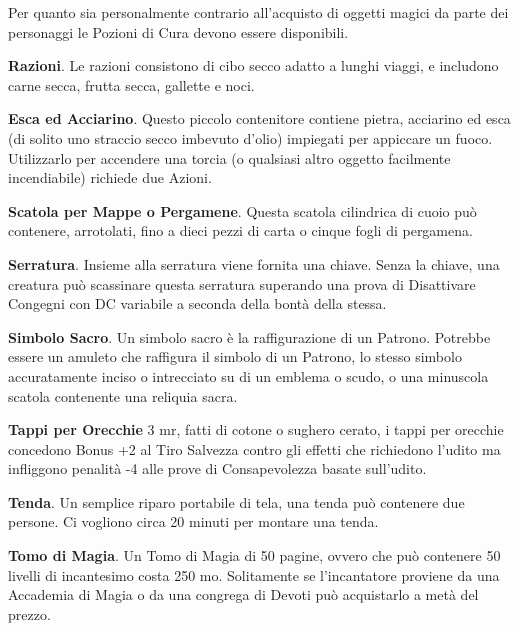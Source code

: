 \begin{multicols}{2}
\begin{narratore}
Per quanto sia personalmente contrario all'acquisto di oggetti magici da parte dei personaggi le Pozioni di Cura devono essere disponibili.
\end{narratore}

\textbf{Razioni}\hypertarget{Razioni}{}\label{Razioni}. Le razioni consistono di cibo secco adatto a lunghi viaggi, e includono carne secca, frutta secca, gallette e noci.

\textbf{Esca ed Acciarino}\label{Esca ed Acciarino}\hypertarget{Esca ed Acciarino}{}. Questo piccolo contenitore contiene pietra, acciarino ed esca (di solito uno straccio secco imbevuto d'olio) impiegati per appiccare un fuoco. Utilizzarlo per accendere una torcia (o qualsiasi altro oggetto facilmente incendiabile) richiede due Azioni.

\textbf{Scatola per Mappe o Pergamene}. Questa scatola cilindrica di cuoio può contenere, arrotolati, fino a dieci pezzi di carta o cinque fogli di pergamena.

\textbf{Serratura}\hypertarget{Serratura}{}. Insieme alla serratura viene fornita una chiave. Senza la chiave, una creatura può scassinare questa serratura superando una prova di Disattivare Congegni con DC variabile a seconda della bontà della stessa.


\textbf{Simbolo Sacro}\label{Simbolo Sacro}. Un simbolo sacro è la raffigurazione di un Patrono. Potrebbe essere un amuleto che raffigura il simbolo di un Patrono, lo stesso simbolo accuratamente inciso o intrecciato su di un emblema o scudo, o una minuscola scatola contenente una reliquia sacra.

\textbf{Tappi per Orecchie} 3 mr, fatti di cotone o sughero cerato, i tappi per orecchie concedono Bonus +2 al Tiro Salvezza contro gli effetti che richiedono l'udito ma infliggono penalità -4 alle prove di Consapevolezza basate sull'udito.

\textbf{Tenda}\label{Tenda}\hypertarget{Tenda}{}. Un semplice riparo portabile di tela, una tenda può contenere due persone. Ci vogliono circa 20 minuti per montare una tenda.

\textbf{Tomo di Magia}. Un Tomo di Magia di 50 pagine, ovvero che può contenere 50 livelli di incantesimo costa 250 mo. Solitamente se l'incantatore proviene da una Accademia di Magia o da una congrega di Devoti può acquistarlo a metà del prezzo.


\end{multicols}
